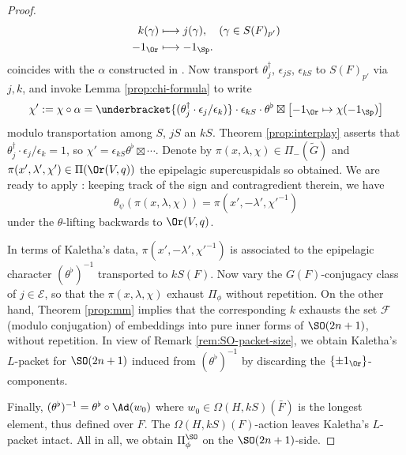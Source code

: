 \documentclass[a4paper,10pt]{article}
\begin{document}
\begin{proof}
\begin{align*}
		k(\gamma) & \longmapsto j(\gamma), \quad (\gamma \in S(F)_{p'}) \\
		-1_{\Or} & \longmapsto -1_{\Sp}.
	\end{align*}
	coincides with the $\alpha$ constructed in \cite[A.2 Proof of Lemma 8.1.1, (ii)]{LMS16}. Now transport $\theta^\dagger_j$, $\epsilon_{jS}$, $\epsilon_{kS}$ to $S(F)_{p'}$ via $j,k$, and invoke Lemma \ref{prop:chi-formula} to write
	\[ \chi' := \chi \circ \alpha = \underbracket{(\theta^\dagger_j \cdot \epsilon_j/\epsilon_k)} \cdot \epsilon_{kS} \cdot \theta^\flat \boxtimes \left[ -1_{\Or} \mapsto \chi(-1_{\Sp}) \right] \]
	modulo transportation among $S$, $jS$ an $kS$. Theorem \ref{prop:interplay} asserts that $\theta^\dagger_j \cdot \epsilon_j/\epsilon_k = 1$, so $\chi' = \epsilon_{kS} \theta^\flat \boxtimes \cdots$. Denote by $\pi(x, \lambda, \chi) \in \Pi_-(\tilde{G})$ and $\pi(x',\lambda',\chi') \in \Pi(\Or(V,q))$ the epipelagic supercuspidals so obtained. We are ready to apply \cite[Theorem 1.2.3 (i)]{LMS16}: keeping track of the sign and contragredient therein, we have
	\[ \theta_\psi\left( \pi(x, \lambda, \chi)\right) = \pi\left( x', -\lambda', \chi'^{-1} \right) \]
	under the $\theta$-lifting backwards to $\Or(V,q)$. %

	In terms of Kaletha's data, $\pi(x', -\lambda', \chi'^{-1})$ is associated to the epipelagic character $(\theta^\flat)^{-1}$ transported to $kS(F)$. Now vary the $G(F)$-conjugacy class of $j \in \mathcal{E}$, so that the $\pi(x, \lambda, \chi)$ exhaust $\Pi_\phi$ without repetition. On the other hand, Theorem \ref{prop:mm} implies that the corresponding $k$ exhausts the set $\mathcal{F}$ (modulo conjugation) of embeddings into pure inner forms of $\SO(2n+1)$, without repetition. In view of Remark \ref{rem:SO-packet-size}, we obtain Kaletha's $L$-packet for $\SO(2n+1)$ induced from $(\theta^\flat)^{-1}$ by discarding the $\{\pm 1_{\Or}\}$-components.

	Finally, $(\theta^\flat)^{-1} = \theta^\flat \circ \Ad(w_0)$ where $w_0 \in \Omega(H,kS)(\bar{F})$ is the longest element, thus defined over $F$. The $\Omega(H,kS)(F)$-action leaves Kaletha's $L$-packet intact. All in all, we obtain $\Pi^{\SO}_\phi$ on the $\SO(2n+1)$-side.
\end{proof}
\end{document}

